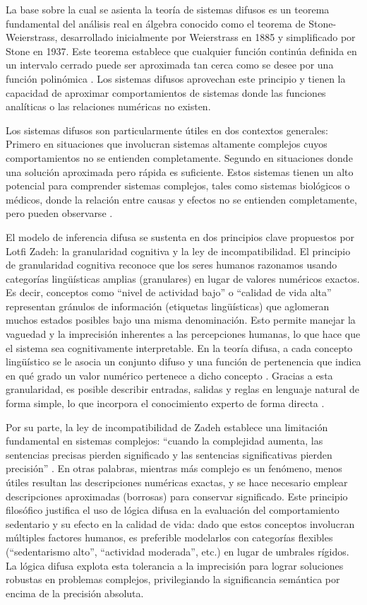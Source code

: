 La base sobre la cual se asienta la teoría de sistemas difusos es un teorema fundamental del análisis real en álgebra conocido como el teorema de Stone-Weierstrass, desarrollado inicialmente por Weierstrass en 1885 y simplificado por Stone en 1937. Este teorema establece que cualquier función continúa definida en un intervalo cerrado puede ser aproximada tan cerca como se desee por una función polinómica \cite{Ross2010,Gupta2011Tribute}. Los sistemas difusos aprovechan este principio y tienen la capacidad de aproximar comportamientos de sistemas donde las funciones analíticas o las relaciones numéricas no existen.

Los sistemas difusos son particularmente útiles en dos contextos generales: Primero en situaciones que involucran sistemas altamente complejos cuyos comportamientos no se entienden completamente. Segundo en situaciones donde una solución aproximada pero rápida es suficiente. Estos sistemas tienen un alto potencial para comprender sistemas complejos, tales como sistemas biológicos o médicos, donde la relación entre causas y efectos no se entienden completamente, pero pueden observarse \cite{Kaur2022}.

El modelo de inferencia difusa se sustenta en dos principios clave propuestos por Lotfi Zadeh: la granularidad cognitiva y la ley de incompatibilidad. El principio de granularidad cognitiva reconoce que los seres humanos razonamos usando categorías lingüísticas amplias (granulares) en lugar de valores numéricos exactos. Es decir, conceptos como ``nivel de actividad bajo'' o ``calidad de vida alta'' representan gránulos de información (etiquetas lingüísticas) que aglomeran muchos estados posibles bajo una misma denominación. Esto permite manejar la vaguedad y la imprecisión inherentes a las percepciones humanas, lo que hace que el sistema sea cognitivamente interpretable. En la teoría difusa, a cada concepto lingüístico se le asocia un conjunto difuso y una función de pertenencia que indica en qué grado un valor numérico pertenece a dicho concepto \cite{Ross2010,Gupta2011Tribute}. Gracias a esta granularidad, es posible describir entradas, salidas y reglas en lenguaje natural de forma simple, lo que incorpora el conocimiento experto de forma directa \cite{Gupta2011Tribute}.

Por su parte, la ley de incompatibilidad de Zadeh establece una limitación fundamental en sistemas complejos: ``cuando la complejidad aumenta, las sentencias precisas pierden significado y las sentencias significativas pierden precisión'' \cite{Levitz1979Logic}. En otras palabras, mientras más complejo es un fenómeno, menos útiles resultan las descripciones numéricas exactas, y se hace necesario emplear descripciones aproximadas (borrosas) para conservar significado. Este principio filosófico justifica el uso de lógica difusa en la evaluación del comportamiento sedentario y su efecto en la calidad de vida: dado que estos conceptos involucran múltiples factores humanos, es preferible modelarlos con categorías flexibles (``sedentarismo alto'', ``actividad moderada'', etc.) en lugar de umbrales rígidos. La lógica difusa explota esta tolerancia a la imprecisión para lograr soluciones robustas en problemas complejos, privilegiando la significancia semántica por encima de la precisión absoluta.

